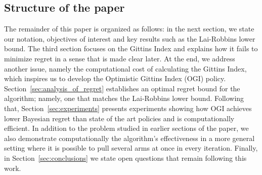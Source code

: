  


\subsection{Structure of the paper}
The remainder of this paper is organized as follows: in the next section, we state our notation, objectives of interest 
and key results such as the Lai-Robbins lower bound. The third section focuses on the Gittins Index and explains how it fails to minimize regret in a sense that is made clear later. At the end, we address another issue, namely the computational cost of calculating the Gittins Index, which inspires us to develop the Optimistic Gittins Index (OGI) policy. Section~\ref{sec:analysis_of_regret} establishes an optimal regret bound for the algorithm; namely, one that matches the Lai-Robbins lower bound. Following that, Section~\ref{sec:experiments} presents experiments showing how OGI achieves lower Bayesian regret than state of the art policies and is computationally efficient. In addition to the problem studied in earlier sections of the paper, we also demonstrate computationally the algorithm's effectiveness in a more general setting where it is possible to pull several arms at once in every iteration. Finally, in Section~\ref{sec:conclusions} we state open questions that remain following this work.
